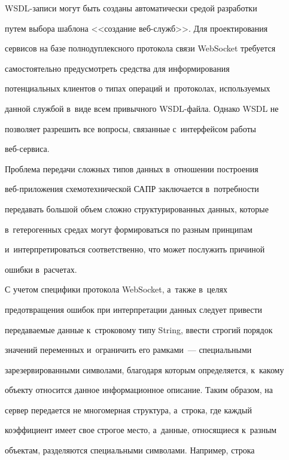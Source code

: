      


     WSDL-записи могут быть созданы автоматически средой разработки 


путем выбора шаблона <<создание веб-служб>>. Для проектирования 


сервисов на базе полнодуплексного протокола связи WebSocket требуется 


самостоятельно предусмотреть средства для информирования 


потенциальных клиентов о типах операций и~протоколах, используемых 


данной службой в~виде всем привычного WSDL-фай\-ла. Однако WSDL не 


позволяет разрешить все вопросы, связанные с~интерфейсом работы  


веб-сер\-виса.


     


     Проблема передачи сложных типов данных в~отношении построения 


веб-при\-ло\-же\-ния схемотехнической САПР заключается в~потребности 


передавать большой объем сложно структурированных данных, которые 


в~гетерогенных средах могут формироваться по разным принципам 


и~интерпретироваться соответственно, что может послужить причиной 


ошибки в~расчетах.


     


     С учетом специфики протокола WebSocket, а~также в~целях 


предотвращения ошибок при интерпретации данных следует привести 


передаваемые данные к~строковому типу String, ввести строгий порядок 


значений переменных и~ограничить его рамками~--- специальными 


зарезервированными символами, благодаря которым определяется, к~какому 


объекту относится данное информационное описание. Таким образом, на 


сервер передается не многомерная структура, а~строка, где каждый 


коэффициент имеет свое строгое место, а~данные, относящиеся к~разным 


объектам, разделяются специальными символами. Например, строка 


